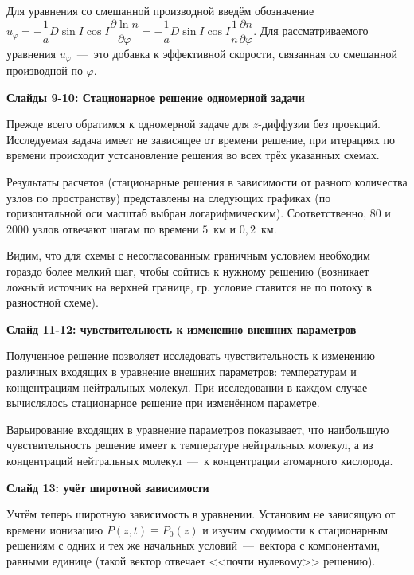 \documentclass[2pt, a4paper, fleqn]{extarticle}
\begin{document}
\smallskip

Для уравнения со смешанной производной введём обозначение $u_\varphi=-\dfrac{1}{a}D\sin I \cos I\dfrac{\partial \ln n}{\partial \varphi}=-\dfrac{1}{a}D\sin I \cos I\dfrac{1}{n}\dfrac{\partial n}{\partial \varphi}.$ Для рассматриваемого уравнения $u_\varphi$~---~это добавка к эффективной скорости, связанная со смешанной производной по $\varphi$.

\medskip

{\bf Слайды 9-10: Стационарное решение одномерной задачи}

Прежде всего обратимся к одномерной задаче для $z$-диффузии без проекций. Исследуемая задача имеет не зависящее от времени решение, при итерациях по времени происходит устсановление решения во всех трёх указанных схемах. 

Результаты расчетов (стационарные решения в зависимости от разного количества узлов по пространству) представлены на следующих графиках (по горизонтальной оси масштаб выбран логарифмическим). Соответственно, $80$ и $2000$ узлов отвечают шагам по времени $5$~км и $0{,}2$~км.

Видим, что для схемы с несогласованным граничным условием необходим гораздо более мелкий шаг, чтобы сойтись к нужному решению (возникает ложный источник на верхней границе, гр. условие ставится не по потоку в разностной схеме).

\medskip
 
{\bf Слайд 11-12: чувствительность к изменению внешних параметров}

Полученное решение позволяет исследовать чувствительность к изменению различных входящих в уравнение внешних параметров: температурам и концентрациям нейтральных молекул. При исследовании в каждом случае вычислялось стационарное решение при изменённом параметре.

Варьирование входящих в уравнение параметров показывает, что наибольшую чувствительность решение имеет к температуре нейтральных молекул, а из концентраций нейтральных молекул~---~к концентрации атомарного кислорода. 

\medskip

{\bf Слайд 13: учёт широтной зависимости}

Учтём теперь широтную зависимость в уравнении.  Установим не зависящую от времени ионизацию $P(z, t) \equiv P_0(z)$ и изучим сходимости к стационарным решениям с одних и тех же начальных условий~---~вектора с компонентами, равными единице (такой вектор отвечает <<почти нулевому>> решению). 
\end{document}

